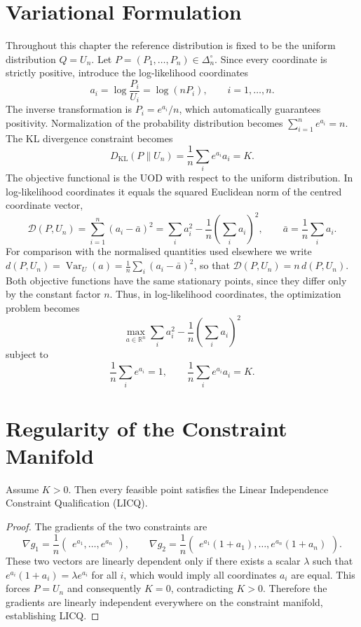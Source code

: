 \section{Variational Formulation}\label{ch:sec:variational-formulation}
Throughout this chapter the reference distribution is fixed to be the uniform distribution \(Q=U_n\).
Let \(P=(P_1,\ldots,P_n)\in\Delta_n^\circ\). Since every coordinate is strictly positive, introduce the log-likelihood coordinates
\[
a_i
=
\log\frac{P_i}{U_i}
=
\log(nP_i),\qquad
i=1,\ldots,n.
\]
The inverse transformation is \(P_i=e^{a_i}/n\), which automatically guarantees positivity.
Normalization of the probability distribution becomes
$\sum_{i=1}^{n}e^{a_i}=n.$
The KL divergence constraint becomes
\[
D_{\mathrm{KL}}(P\|U_n)
=
\frac1n\sum_i e^{a_i}a_i
=
K.
\]
The objective functional is the UOD with respect to the uniform distribution.  In
log-likelihood coordinates it equals the squared Euclidean norm of the centred
coordinate vector,
\[
\mathcal D(P,U_n)
=
\sum_{i=1}^n (a_i-\bar a)^2
=
\sum_i a_i^2
-
\frac1n\left(\sum_i a_i\right)^2,
\qquad
\bar a=\frac1n\sum_i a_i.
\]
For comparison with the normalised quantities used elsewhere we write
\(d(P,U_n)=\operatorname{Var}_U(a)=\frac1n\sum_i(a_i-\bar a)^2\), so that
\(\mathcal D(P,U_n)=n\,d(P,U_n)\).  Both objective functions have the same
stationary points, since they differ only by the constant factor \(n\).
Thus, in log-likelihood coordinates, the optimization problem becomes
\[
\max_{a\in\mathbb R^n}
\sum_i a_i^2
-
\frac1n\left(\sum_i a_i\right)^2
\]
subject to
\[
\frac1n\sum_i e^{a_i}=1,
\qquad
\frac1n\sum_i e^{a_i}a_i=K.
\]
\section{Regularity of the Constraint Manifold}\label{ch:sec:regularity-of-the-constraint-manifold}
\begin{lemma}
\label{ch:lem:29-1}
Assume \(K>0\). Then every feasible point satisfies the Linear Independence Constraint Qualification (LICQ).
\end{lemma}
\begin{proof}
The gradients of the two constraints are
\[
\nabla g_1
=
\frac1n
\begin{pmatrix}
e^{a_1}, \ldots, e^{a_n}
\end{pmatrix},
\qquad
\nabla g_2
=
\frac1n
\begin{pmatrix}
e^{a_1}(1+a_1), \ldots, e^{a_n}(1+a_n)
\end{pmatrix}.
\]
These two vectors are linearly dependent only if there exists a scalar \(\lambda\) such that \(e^{a_i}(1+a_i)=\lambda e^{a_i}\) for all \(i\), which would imply all coordinates \(a_i\) are equal. This forces \(P=U_n\) and consequently \(K=0\), contradicting \(K>0\). Therefore the gradients are linearly independent everywhere on the constraint manifold, establishing LICQ. 
\end{proof}
